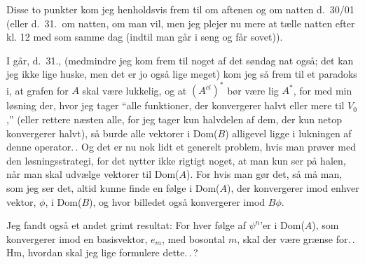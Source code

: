 \documentclass{report}
\begin{document}
Disse to punkter kom jeg henholdsvis frem til om aftenen og om natten d.\ 30/01 (eller d.\ 31.\ om natten, om man vil, men jeg plejer nu mere at tælle natten efter kl. 12 med som samme dag (indtil man går i seng og får sovet)).

I går, d.\ 31., (medmindre jeg kom frem til noget af det søndag nat også; det kan jeg ikke lige huske, men det er jo også lige meget) kom jeg så frem til et paradoks i, at grafen for $A$ skal være lukkelig, og at $(A^{cl})^*$ bør være lig $A^*$, for med min løsning der, hvor jeg tager ``alle funktioner, der konvergerer halvt eller mere til $V_0$,'' (eller rettere næsten alle, for jeg tager kun halvdelen af dem, der kun netop konvergerer halvt), så burde alle vektorer i Dom($B$) alligevel ligge i lukningen af denne operator.\,. Og det er nu nok lidt et generelt problem, hvis man prøver med den løsningsstrategi, for det nytter ikke rigtigt noget, at man kun ser på halen, når man skal udvælge vektorer til Dom($A$). For hvis man gør det, så må man, som jeg ser det, altid kunne finde en følge i Dom($A$), der konvergerer imod enhver vektor, $\phi$, i Dom($B$), og hvor billedet også konvergerer imod $B\phi$. 

Jeg fandt også et andet grimt resultat: For hver følge af $\psi^n$'er i Dom($A$), som konvergerer imod en basisvektor, $e_m$, med bosontal $m$, skal der være grænse for.\,. Hm, hvordan skal jeg lige formulere dette.\,.\,? %
\end{document}
